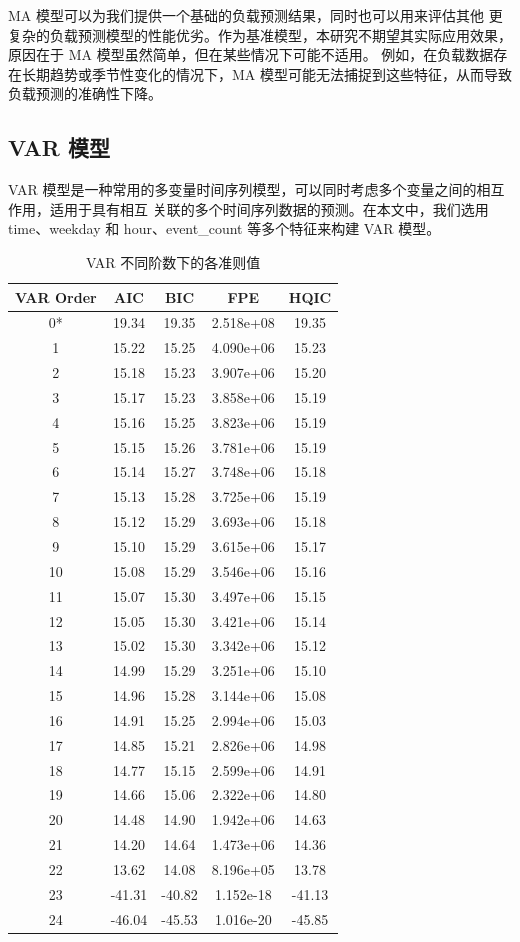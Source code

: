 \documentclass[a4paper,AutoFakeBold,oneside,12pt]{book}
\begin{document}
MA 模型可以为我们提供一个基础的负载预测结果，同时也可以用来评估其他
更复杂的负载预测模型的性能优劣。作为基准模型，本研究不期望其实际应用效果，原因在于 MA 模型虽然简单，但在某些情况下可能不适用。
例如，在负载数据存在长期趋势或季节性变化的情况下，MA 模型可能无法捕捉到这些特征，从而导致负载预测的准确性下降。

\subsection{VAR 模型}

VAR 模型是一种常用的多变量时间序列模型，可以同时考虑多个变量之间的相互作用，适用于具有相互
关联的多个时间序列数据的预测。在本文中，我们选用 time、weekday 和 hour、event\_count 等多个特征来构建 VAR 模型。

\begin{table}[tbp]
	\centering
	\caption{VAR 不同阶数下的各准则值}
	\label{table:var_order_selection}
	\begin{tabular}{c|c|c|c|c}
	\hline
	\textbf{VAR Order} & \textbf{AIC} & \textbf{BIC} & \textbf{FPE} & \textbf{HQIC} \\
	\hline
	0* & 19.34 & 19.35 & 2.518e+08 & 19.35 \\
	1 & 15.22 & 15.25 & 4.090e+06 & 15.23 \\
	2 & 15.18 & 15.23 & 3.907e+06 & 15.20 \\
	3 & 15.17 & 15.23 & 3.858e+06 & 15.19 \\
	4 & 15.16 & 15.25 & 3.823e+06 & 15.19 \\
	5 & 15.15 & 15.26 & 3.781e+06 & 15.19 \\
	6 & 15.14 & 15.27 & 3.748e+06 & 15.18 \\
	7 & 15.13 & 15.28 & 3.725e+06 & 15.19 \\
	8 & 15.12 & 15.29 & 3.693e+06 & 15.18 \\
	9 & 15.10 & 15.29 & 3.615e+06 & 15.17 \\
	10 & 15.08 & 15.29 & 3.546e+06 & 15.16 \\
	11 & 15.07 & 15.30 & 3.497e+06 & 15.15 \\
	12 & 15.05 & 15.30 & 3.421e+06 & 15.14 \\
	13 & 15.02 & 15.30 & 3.342e+06 & 15.12 \\
	14 & 14.99 & 15.29 & 3.251e+06 & 15.10 \\
	15 & 14.96 & 15.28 & 3.144e+06 & 15.08 \\
	16 & 14.91 & 15.25 & 2.994e+06 & 15.03 \\
	17 & 14.85 & 15.21 & 2.826e+06 & 14.98 \\
	18 & 14.77 & 15.15 & 2.599e+06 & 14.91 \\
	19 & 14.66 & 15.06 & 2.322e+06 & 14.80 \\
	20 & 14.48 & 14.90 & 1.942e+06 & 14.63 \\
	21 & 14.20 & 14.64 & 1.473e+06 & 14.36 \\
	22 & 13.62 & 14.08 & 8.196e+05 & 13.78 \\
	23 & -41.31 & -40.82 & 1.152e-18 & -41.13 \\
	24 & -46.04 & -45.53 & 1.016e-20 & -45.85 \\
	\hline
\end{tabular}
\end{table}
\end{document}
